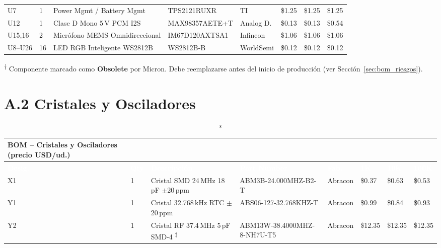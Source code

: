 \begin{longtable}{C{1cm} C{0.5cm} L{2.8cm} L{3.0cm} L{1.8cm} R{1.1cm} R{1.1cm} R{1.1cm}}
  U7  & 1 & Power Mgmt / Battery Mgmt         & TPS2121RUXR           & TI       & \$1.25 & \$1.25 & \$1.25 \\
  U12 & 1 & Clase D Mono 5\,V PCM I2S         & MAX98357AETE+T        & Analog D.& \$0.13 & \$0.13 & \$0.54 \\
  U15,16 & 2 & Micrófono MEMS Omnidireccional & IM67D120AXTSA1        & Infineon & \$1.06 & \$1.06 & \$1.06 \\
  U8--U26 & 16 & LED RGB Inteligente WS2812B  & WS2812B-B             & WorldSemi& \$0.12 & \$0.12 & \$0.12 \\
\end{longtable}

\noindent\textsuperscript{†} Componente marcado como \textbf{Obsolete} por Micron.
Debe reemplazarse antes del inicio de producción (ver Sección~\ref{sec:bom_riesgos}).

\section*{A.2 Cristales y Osciladores}

\begin{longtable}{C{1cm} C{0.5cm} L{2.8cm} L{3.0cm} L{1.8cm} R{1.1cm} R{1.1cm} R{1.1cm}}
  \caption*{BOM -- Cristales y Osciladores (precio USD/ud.)}\\
  \toprule
  \textcolor{white}{\textbf{Desig.}} &
  \textcolor{white}{\textbf{Qty}} &
  \textcolor{white}{\textbf{Descripción}} &
  \textcolor{white}{\textbf{Part Number}} &
  \textcolor{white}{\textbf{Fab.}} &
  \textcolor{white}{\textbf{1K}} &
  \textcolor{white}{\textbf{10K}} &
  \textcolor{white}{\textbf{100K}} \\
  \midrule
  \endfirsthead
  \midrule \endhead \bottomrule \endfoot
  X1  & 1 & Cristal SMD 24\,MHz 18\,pF $\pm$20\,ppm & ABM3B-24.000MHZ-B2-T  & Abracon  & \$0.37 & \$0.63 & \$0.53 \\
  Y1  & 1 & Cristal 32.768\,kHz RTC $\pm$20\,ppm    & ABS06-127-32.768KHZ-T & Abracon  & \$0.99 & \$0.84 & \$0.93 \\
  Y2  & 1 & Cristal RF 37.4\,MHz 5\,pF SMD-4 \textsuperscript{‡} & ABM13W-38.4000MHZ-8-NH7U-T5 & Abracon & \$12.35 & \$12.35 & \$12.35 \\
\end{longtable}

